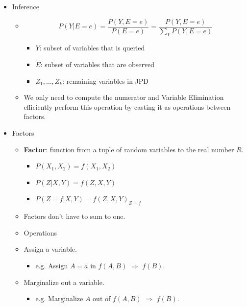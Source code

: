 \documentclass{article}
\begin{document}
\begin{itemize}
    \item Inference
        \begin{itemize}
            \item
            \begin{equation*}
                P(Y|E=e) = \frac{P(Y, E=e)}{P(E=e)} = \frac{P(Y, E=e)}{\sum\limits_{Y} P(Y, E=e)}
            \end{equation*}
            \begin{itemize}
                \item $Y$: subset of variables that is queried
                \item $E$: subset of variables that are observed
                \item $Z_1, \ldots, Z_k$: remaining variables in JPD
            \end{itemize}
            \item We only need to compute the numerator and Variable Elimination efficiently perform this operation by casting it as operations between factors.
        \end{itemize}
    \item Factors
        \begin{itemize}
            \item \textbf{Factor}: function from a tuple of random variables to the real number $R$.
                \begin{itemize}
                    \item $P(X_1, X_2) = f(X_1, X_2)$
                    \item $P(Z|X, Y) = f(Z, X, Y)$
                    \item $P(Z=f|X, Y) = f(Z, X, Y)_{Z=f}$
                \end{itemize}
            \item Factors don't have to sum to one.
            \item Operations
                \item Assign a variable.
                    \begin{itemize}
                        \item e.g. Assign $A=a$ in $f(A, B)$ $\Rightarrow$ $f(B)$.
                    \end{itemize}
            \item Marginalize out a variable.
                \begin{itemize}
                    \item e.g. Marginalize $A$ out of $f(A, B)$ $\Rightarrow$ $f(B)$.

\end{itemize}
\end{itemize}
\end{itemize}
\end{document}
